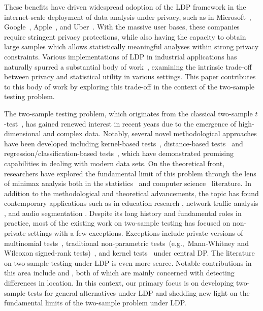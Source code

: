\documentclass[twoside,11pt]{article}
\begin{document}
These benefits have driven widespread adoption of the LDP framework in the internet-scale deployment of data analysis under privacy, such as in
Microsoft~\citep{Ding2017CollectingPrivately},
Google~\citep{erlingsson_rappor_2014},
Apple~\citep{Apple2017Privacy},
and Uber~\citep{Near2017Uber}. With the massive user bases, these companies require stringent privacy protections, while also having the capacity to obtain large samples which allows statistically meaningful analyses within strong privacy constraints. Various implementations of LDP in industrial applications has naturally spurred a substantial body of work~\citep{Acharya2021DifferentiallyCam, Duchi2018MinimaxEstimation, Lam-Weil2021MinimaxConstraint, Lalanne2023on, Tony2021DP}, examining the intrinsic trade-off between privacy and statistical utility in various settings. This paper contributes to this body of work by exploring this trade-off in the context of the two-sample testing problem. 

The two-sample testing problem, which originates from the classical two-sample $t$-test~\citep{Student1908Twosample}, has gained renewed interest in recent years due to the emergence of high-dimensional and complex data.  
Notably, several novel methodological approaches have been developed including kernel-based tests~\citep{Gretton2009FastKernel, Gretton2012ATest}, distance-based tests~\citep{Szekely2004Energy, Szekely2005Energy} and regression/classification-based tests~\citep{kim2019,kim2021}, which have demonstrated promising capabilities in dealing with modern data sets.
On the theoretical front, researchers have explored the fundamental limit of this problem through the lens of minimax analysis both in the statistics~\citep[e.g.,][]{Arias-Castro2018RememberDimension, kim_minimax_2022, Schrab2021MMDTest} and computer science~\citep[e.g.,][]{Batu2000NonprivateTwosample, Chan2014Nonprivate, Diakonikolas2016Nonprivate, Goldreich2000Nonprivate} literature.
In addition to the methodological and theoretical advancements, the topic has found contemporary applications such as in education research \citep{Rabin2019ModelingTests}, network traffic analysis \citep{Kohout2018NetworkTest}, and audio segmentation \citep{Harchaoui2009ASegmentation}.
Despite its long history and fundamental roles in practice, most of the existing work on two-sample testing has focused on non-private settings with a few exceptions. Exceptions include private versions of
multinomial tests~\citep{Acharya2018dPGofTwosample, Aliakbarpour2019PrivatePermutations,Aliakbarpour2018DPgof},
traditional non-parametric tests~(e.g.,~Mann-Whitney and Wilcoxon signed-rank tests)~\cite{Couch2019NonparamTwosample,Task2016Wilcoxon},
and kernel tests~\cite{Raj2020ATest,kim2023dp} under central DP. The literature on two-sample testing under LDP is even more scarce. Notable contributions in this area include \cite{Ding2018TwosampleMean} and \cite{Waudby-Smith2022LDPTwosample}, both of which are mainly concerned with detecting differences in location. In this context, our primary focus is on developing two-sample tests for general alternatives under LDP and shedding new light on the fundamental limits of the two-sample problem under LDP. 
\end{document}
